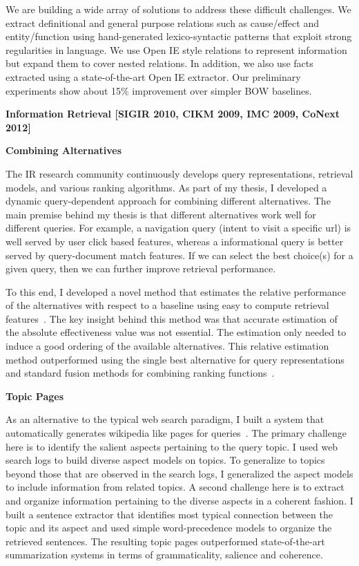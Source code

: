 \documentclass[a4paper,11pt,onecolumn]{article}
\begin{document}
We are building a wide array of solutions to address these difficult challenges. We extract definitional and general purpose relations such as cause/effect and entity/function using hand-generated lexico-syntactic patterns that exploit strong regularities in language. We use Open IE style relations to represent information but expand them to cover nested relations. In addition, we also use facts extracted using a state-of-the-art Open IE extractor. Our preliminary experiments show about 15\% improvement over simpler BOW baselines.

{\bf Information Retrieval [SIGIR 2010, CIKM 2009, IMC 2009, CoNext 2012]}


{\bf Combining Alternatives}

The IR research community continuously develops query representations, retrieval models, and various ranking algorithms. As part of my thesis, I developed a dynamic query-dependent approach for combining different alternatives. The main premise behind my thesis is that different alternatives work well for different queries. For example, a navigation query (intent to visit a specific url) is well served by user click based features, whereas a informational query is better served by query-document match features. If we can select the best choice(s) for a given query, then we can further improve retrieval performance. 

To this end, I developed a novel method that estimates the relative performance of the alternatives with respect to a baseline using easy to compute retrieval features~\cite{balasubramanian-sigir10a}. The key insight behind this method was that accurate estimation of the absolute effectiveness value was not essential. The estimation only needed to induce a good ordering of the available alternatives. This relative estimation method outperformed using the single best alternative for query representations~\cite{balasubramanian-sigir10b} and standard fusion methods for combining ranking functions~\cite{balasubramanian-sigir10c}. 


{\bf Topic Pages}

As an alternative to the typical web search paradigm, I built a system that automatically generates wikipedia like pages for queries~\cite{balasubramanian-icsc2010}. The primary challenge here is to identify the salient aspects pertaining to the query topic. I used web search logs to build diverse aspect models on topics. To generalize to topics beyond those that are observed in the search logs, I generalized the aspect models to include information from related topics. A second challenge here is to extract and organize information pertaining to the diverse aspects in a coherent fashion. I built a sentence extractor that identifies most typical connection between the topic and its aspect and used simple word-precedence models to organize the retrieved sentences. The resulting topic pages outperformed state-of-the-art summarization systems in terms of grammaticality, salience and coherence.
\end{document}
